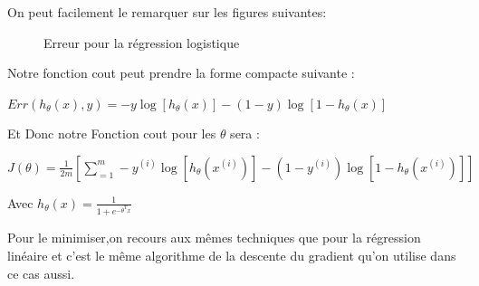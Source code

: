 On peut facilement le remarquer sur les figures suivantes: \\
\begin{figure}[ht]
	\centering
	\hfill
	\hfill
	\caption{Erreur  pour la régression logistique}
\end{figure}
Notre fonction cout peut prendre la forme compacte suivante :
\begin{center}
	$Err({h}_{\theta}\left(x\right),y) = -y\log [{h}_{\theta}\left(x\right)] -(1-y)\log [1-{h}_{\theta}\left(x\right)]$ 
\end{center}	
Et Donc notre Fonction cout pour les $\theta$ sera :
\begin{center}
$J\left({\theta }\right)=\frac{1}{2m}[\sum _{=1}^{m}-{y}^{(i)}\log [{h}_{\theta}\left({x}^{(i)}\right)] -(1-{y}^{(i)})\log [1-{h}_{\theta}\left({x}^{(i)}\right)]]$
\end{center}


Avec ${h}_{\theta}\left(x\right) =\frac{1}{1+{e}^{-{\theta }^{T}{x}}}$

 Pour le minimiser,on recours aux mêmes techniques que pour la régression linéaire et c'est le même algorithme de la descente du gradient qu'on utilise  dans ce cas aussi.
